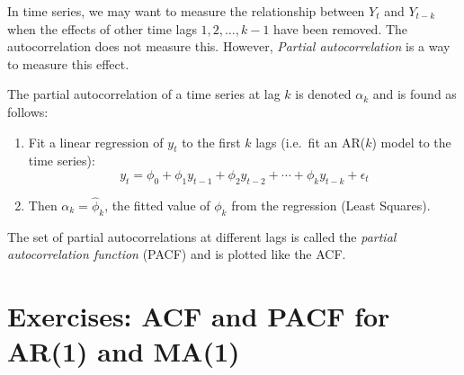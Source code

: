 \documentclass[a4paper,11pt,oneside,onecolumn]{book}
\begin{document}
In time series, we may want to measure the
relationship between $Y_t$ and $Y_{t-k}$ when the effects of other
time lags $1,2,\ldots,k-1$ have been removed. The autocorrelation
does not measure this. However, {\it Partial autocorrelation} is a
way to measure this effect.

\begin{definition}[PACF]
The partial autocorrelation of a time series at lag $k$ is denoted
$\alpha_k$ and is found as follows:
\begin{enumerate}
\item Fit a linear regression of $y_t$ to the first $k$ lags (i.e.\ fit
an AR($k$) model to the time series):
\[ y_t = \phi_0 + \phi_1 y_{t-1} + \phi_2 y_{t-2} + \cdots + \phi_k
y_{t-k} +\epsilon_t \]
\item Then $\alpha_k = \hat{\phi}_k$, the fitted value of $\phi_k$ from
the regression (Least Squares).
\end{enumerate}
The set of partial autocorrelations at different lags is called the
{\it partial autocorrelation function} (PACF) and is plotted like
the ACF. 
\end{definition}



\section{Exercises:  ACF and PACF for AR(1) and MA(1)}
\end{document}
